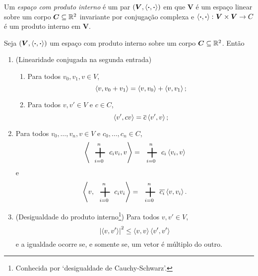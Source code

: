\begin{definition}
Um \emph{espaço com produto interno} é um par $(\bm V,\left\langle{\bm{\cdot}},{\bm{\cdot}}\right\rangle)$ em que $\bm V$ é um espaço linear sobre um corpo $\bm C \subseteq \mathbb{R}^2$ invariante por conjugação complexa e $\left\langle{\bm{\cdot}},{\bm{\cdot}}\right\rangle\colon \bm V \times \bm V \to C$ é um produto interno em $\bm V$.
\end{definition}

\begin{proposition}
Seja $(\bm V,\left\langle{\bm{\cdot}},{\bm{\cdot}}\right\rangle)$ um espaço com produto interno sobre um corpo $\bm C \subseteq \mathbb{R}^2$. Então
	\begin{enumerate}
	\item (Linearidade conjugada na segunda entrada)
		\begin{enumerate}
		\item Para todos $v_0,v_1,v \in V$,
			\begin{equation*}
			\left\langle{v},{v_0+v_1}\right\rangle = \left\langle{v},{v_0}\right\rangle + \left\langle{v},{v_1}\right\rangle;
			\end{equation*}
		\item Para todos $v,v' \in V$ e $c \in C$,
			\begin{equation*}
			\left\langle{v'},{cv}\right\rangle = \overline{c}\left\langle{v'},{v}\right\rangle;
			\end{equation*}
		\end{enumerate}
	\item Para todos $v_0,\ldots,v_n,v \in V$ e $c_0,\ldots,c_n \in C$,
		\begin{equation*}
		\inte{\sum_{i=0}^n c_iv_i}{v} = \sum_{i=0}^n c_i\inte{v_i}{v}
		\end{equation*}
e
		\begin{equation*}
		\inte{v}{\sum_{i=0}^n c_iv_i} = \sum_{i=0}^n \conju{c_i}\inte{v}{v_i}.
		\end{equation*}
	\item (Desigualdade do produto interno\footnote{Conhecida por `desigualdade de Cauchy-Schwarz'.}) Para todos $v,v' \in V$,
		\begin{equation*}
		\left\vert{\left\langle{v},{v'}\right\rangle}\right\vert^2 \leq \left\langle{v},{v}\right\rangle\left\langle{v'},{v'}\right\rangle
		\end{equation*}
		e a igualdade ocorre se, e somente se, um vetor é múltiplo do outro.
		\end{enumerate}
\end{proposition}
